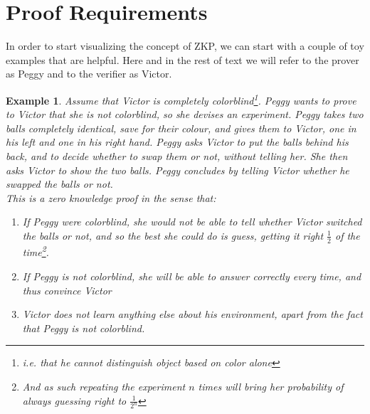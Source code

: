 \documentclass{article}
\newtheorem{example}{Example}
\begin{document}
\section{Proof Requirements}
In order to start visualizing the concept of ZKP, we can start with a couple of toy examples that are helpful. Here and in the rest of text we will refer to the prover as Peggy and to the verifier as Victor.
\begin{example}
Assume that Victor is completely colorblind\footnote{i.e. that he cannot distinguish object based on color alone}. Peggy wants to prove to Victor that she is not colorblind, so she devises an experiment. Peggy takes two balls completely identical, save for their colour, and gives them to Victor, one in his left and one in his right hand. Peggy asks Victor to put the balls behind his back, and to decide whether to swap them or not, without telling her. She then asks Victor to show the two balls. Peggy concludes by telling Victor whether he swapped the balls or not.\\
This is a zero knowledge proof in the sense that:
\begin{enumerate}
    \item If Peggy were colorblind, she would not be able to tell whether Victor switched the balls or not, and so the best she could do is guess, getting it right $\frac{1}{2}$ of the time\footnote{And as such repeating the experiment $n$ times will bring her probability of always guessing right to $\frac{1}{2^n}$}.
    \item If Peggy is not colorblind, she will be able to answer correctly every time, and thus convince Victor
    \item Victor does not learn anything else about his environment, apart from the fact that Peggy is not colorblind. 
\end{enumerate}
\end{example}
\end{document}
